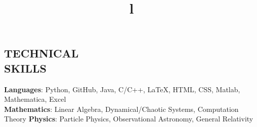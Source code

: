 \documentclass[margin]{res}
\begin{document}
\begin{resume}
\section{TECHNICAL\\SKILLS}

\textbf{Languages}: Python, GitHub, Java, C/C++, \LaTeX, HTML, CSS, Matlab, Mathematica, Excel
\\
\textbf{Mathematics}: Linear Algebra, Dynamical/Chaotic Systems, Computation Theory 
\textbf{Physics}: Particle Physics, Observational Astronomy, General Relativity


\begin{format}
\title{l}\\
\\
\body\\
\end{format}


\end{resume}
\end{document}
